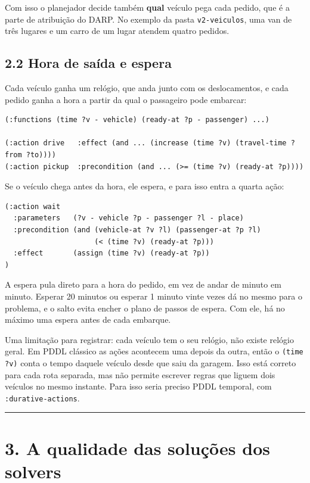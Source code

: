 \documentclass[11pt,a4paper]{article}
\newcommand{\cod}[1]{\texttt{#1}}
\newcommand{\separador}{\begin{center}\rule{0.45\linewidth}{0.4pt}\end{center}}
\begin{document}
Com isso o planejador decide também \textbf{qual} veículo pega cada pedido, que é a parte de atribuição do DARP. No exemplo da pasta \cod{v2-veiculos}, uma van de três lugares e um carro de um lugar atendem quatro pedidos.

\subsection*{2.2 Hora de saída e espera}

Cada veículo ganha um relógio, que anda junto com os deslocamentos, e cada pedido ganha a hora a partir da qual o passageiro pode embarcar:

\begin{lstlisting}
(:functions (time ?v - vehicle) (ready-at ?p - passenger) ...)

(:action drive   :effect (and ... (increase (time ?v) (travel-time ?from ?to))))
(:action pickup  :precondition (and ... (>= (time ?v) (ready-at ?p))))
\end{lstlisting}

Se o veículo chega antes da hora, ele espera, e para isso entra a quarta ação:

\begin{lstlisting}
(:action wait
  :parameters   (?v - vehicle ?p - passenger ?l - place)
  :precondition (and (vehicle-at ?v ?l) (passenger-at ?p ?l)
                     (< (time ?v) (ready-at ?p)))
  :effect       (assign (time ?v) (ready-at ?p))
)
\end{lstlisting}

A espera pula direto para a hora do pedido, em vez de andar de minuto em minuto. Esperar 20 minutos ou esperar 1 minuto vinte vezes dá no mesmo para o problema, e o salto evita encher o plano de passos de espera. Com ele, há no máximo uma espera antes de cada embarque.

Uma limitação para registrar: cada veículo tem o seu relógio, não existe relógio geral. Em PDDL clássico as ações acontecem uma depois da outra, então o \cod{(time ?v)} conta o tempo daquele veículo desde que saiu da garagem. Isso está correto para cada rota separada, mas não permite escrever regras que liguem dois veículos no mesmo instante. Para isso seria preciso PDDL temporal, com \cod{:durative-actions}.

\separador

\section*{3. A qualidade das soluções dos solvers}
\end{document}
